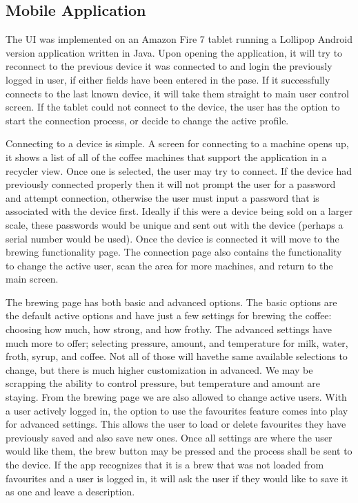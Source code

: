 \documentclass[conference]{IEEEtran}
\begin{document}
\subsection{Mobile Application}
The UI was implemented on an Amazon Fire 7 tablet
running a Lollipop Android version application written in Java.
Upon opening the application, it will try to reconnect to the
previous device it was connected to and login the previously
logged in user, if either fields have been entered in the pase. If
it successfully connects to the last known device, it will take
them straight to main user control screen. If the tablet could
not connect to the device, the user has the option to start the
connection process, or decide to change the active profile.

Connecting to a device is simple. A screen for connecting
to a machine opens up, it shows a list of all of the coffee
machines that support the application in a recycler view. Once
one is selected, the user may try to connect. If the device
had previously connected properly then it will not prompt the
user for a password and attempt connection, otherwise the
user must input a password that is associated with the device
first. Ideally if this were a device being sold on a larger scale,
these passwords would be unique and sent out with the device
(perhaps a serial number would be used). Once the device is
connected it will move to the brewing functionality page. The
connection page also contains the functionality to change the
active user, scan the area for more machines, and return to the
main screen.

The brewing page has both basic and advanced options.
The basic options are the default active options and have just
a few settings for brewing the coffee: choosing how much,
how strong, and how frothy. The advanced settings have much
more to offer; selecting pressure, amount, and temperature for
milk, water, froth, syrup, and coffee. Not all of those will havethe same
available selections to change, but there is much higher customization in
advanced. We may be scrapping the ability to control pressure, but temperature
and amount are staying. From the brewing page we are also allowed to change
active users. With a user actively logged in, the option to use
the favourites feature comes into play for advanced settings.
This allows the user to load or delete favourites they have
previously saved and also save new ones. Once all settings
are where the user would like them, the brew button may be
pressed and the process shall be sent to the device. If the app
recognizes that it is a brew that was not loaded from favourites
and a user is logged in, it will ask the user if they would like
to save it as one and leave a description.
\end{document}
